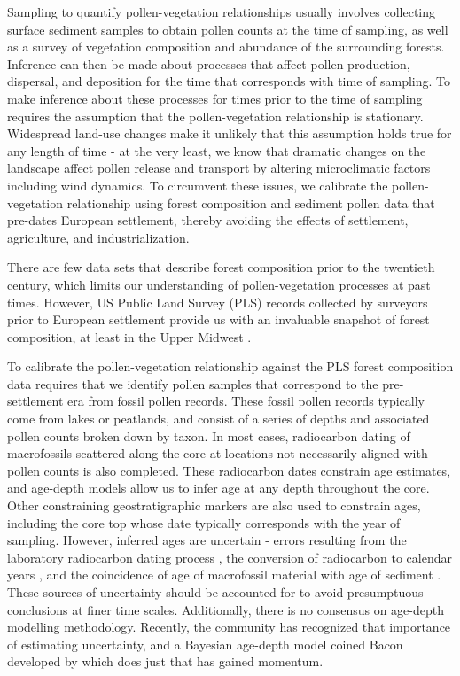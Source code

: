 \documentclass[12pt]{article}
\begin{document}
Sampling to quantify pollen-vegetation relationships usually involves
collecting surface sediment samples to obtain pollen counts at the
time of sampling, as well as a survey of vegetation composition and
abundance of the surrounding forests. Inference can then be made about
processes that affect pollen production, dispersal, and deposition for
the time that corresponds with time of sampling. To make inference
about these processes for times prior to the time of sampling requires
the assumption that the pollen-vegetation relationship is
stationary. Widespread land-use changes make it unlikely that this
assumption holds true for any length of time - at the very least, we
know that dramatic changes on the landscape affect pollen release and
transport by altering microclimatic factors including wind
dynamics. To circumvent these issues, we calibrate the pollen-vegetation
relationship using forest composition and sediment pollen data that
pre-dates European settlement, thereby avoiding the effects of
settlement, agriculture, and industrialization. 

There are few data sets that describe forest composition prior to the
twentieth century, which limits our understanding of pollen-vegetation
processes at past times. However, US Public Land Survey (PLS) records
collected by surveyors prior to European settlement provide us with an
invaluable snapshot of forest composition, at least in the Upper Midwest
\citep{bourdo1956review, schulte2001original}.

To calibrate the pollen-vegetation relationship against the PLS forest
composition data requires that we identify pollen samples that
correspond to the pre-settlement era from fossil pollen records. These
fossil pollen records typically come from lakes or peatlands, and
consist of a series of depths and associated pollen counts broken down
by taxon. In most cases, radiocarbon dating of macrofossils scattered
along the core at locations not necessarily aligned with pollen counts
is also completed. These radiocarbon dates constrain age estimates,
and age-depth models allow us to infer age at any depth throughout the
core. Other constraining geostratigraphic markers are also used to
constrain ages, including the core top whose date typically
corresponds with the year of sampling. However, inferred ages are
uncertain - errors resulting from the laboratory radiocarbon dating
process \citep{ward1978procedures}, the conversion of radiocarbon to
calendar years \citep{reimer2013intcal13}, and the coincidence of age
of macrofossil material with age of sediment
\citep{blois2011methodological}. These sources of uncertainty should
be accounted for to avoid presumptuous conclusions at finer time
scales. Additionally, there is no consensus on age-depth modelling
methodology. Recently, the community has recognized that importance of
estimating uncertainty, and a Bayesian age-depth model coined Bacon
developed by \citet{blaauw2011flexible} which does just that has
gained momentum.
\end{document}
